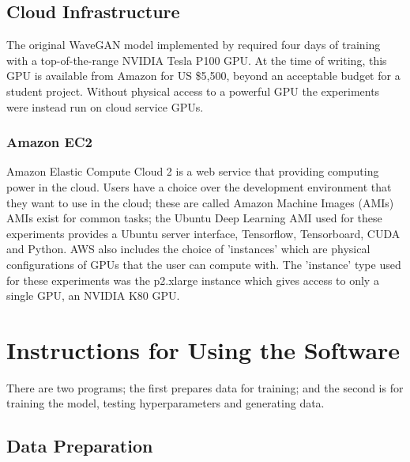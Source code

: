 \documentclass[a4paper, titlepage]{article}
\begin{document}
\begin{appendices}
  \subsection{Cloud Infrastructure}

  The original WaveGAN model implemented by \citeauthor{2018arXiv180204208D} required four days of training with a top-of-the-range NVIDIA Tesla P100 GPU.
  At the time of writing, this GPU is available from Amazon for US \$5,500, beyond an acceptable budget for a student project.
  Without physical access to a powerful GPU the experiments were instead run on cloud service GPUs.

  \subsubsection{Amazon EC2}

  Amazon Elastic Compute Cloud 2 is a web service that providing computing power in the cloud.
  Users have a choice over the development environment that they want to use in the cloud; these are called Amazon Machine Images (AMIs)
  AMIs exist for common tasks; the Ubuntu Deep Learning AMI used for these experiments provides a Ubuntu server interface, Tensorflow, Tensorboard, CUDA and Python.
  \newline
  \newline
  AWS also includes the choice of 'instances' which are physical configurations of GPUs that the user can compute with.
  The 'instance' type used for these experiments was the p2.xlarge instance which gives access to only a single GPU, an NVIDIA K80 GPU.

  \newpage

  \section{Instructions for Using the Software}

  There are two programs; the first prepares data for training; and the second is for training the model, testing hyperparameters and generating data.

  \subsection{Data Preparation}


\end{appendices}
\end{document}
